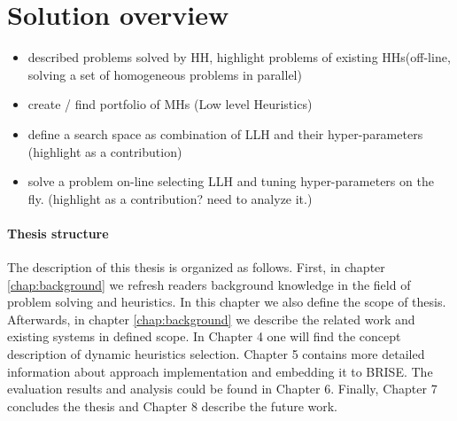 \section{Solution overview}

\begin{itemize}
	\item described problems solved by HH, highlight problems of existing HHs(off-line, solving a set of homogeneous problems in parallel)
	\item create / find portfolio of MHs (Low level Heuristics)
	\item define a search space as combination of LLH and their hyper-parameters (highlight as a contribution)
	\item solve a problem on-line selecting LLH and tuning hyper-parameters on the fly. (highlight as a contribution? need to analyze it.)
\end{itemize}

\paragraph{Thesis structure}
The description of this thesis is organized as follows. First, in chapter \ref{chap:background} we refresh readers background knowledge in the field of problem solving and heuristics. In this chapter we also define the scope of thesis. Afterwards, in chapter \ref{chap:background} we describe the related work and existing systems in defined scope. In Chapter 4 one will find the concept description of dynamic heuristics selection. Chapter 5 contains more detailed information about approach implementation and  embedding it to BRISE. The evaluation results and analysis could be found in Chapter 6. Finally, Chapter 7 concludes the thesis and Chapter 8 describe the future work.

